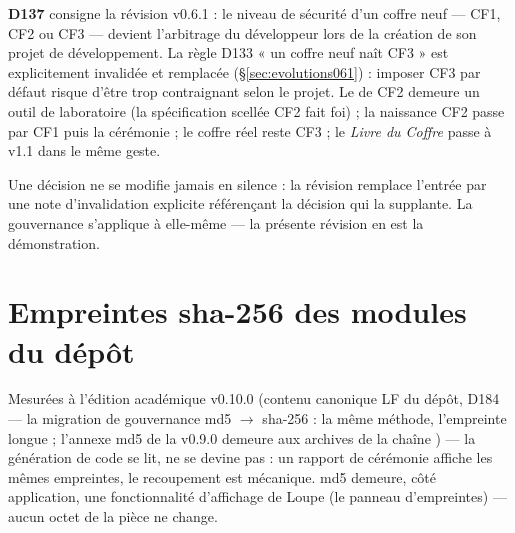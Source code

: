 \textbf{D137} consigne la révision v0.6.1 : le niveau de sécurité d'un coffre neuf —
CF1, CF2 ou CF3 — devient l'arbitrage du développeur lors de la création de son projet
de développement. La règle D133 « un coffre neuf naît CF3 » est explicitement
invalidée et remplacée (§\ref{sec:evolutions061}) : imposer CF3 par défaut risque
d'être trop contraignant selon le projet. Le  de CF2 demeure un outil de
laboratoire (la spécification scellée CF2 fait foi) ; la naissance CF2 passe par
 CF1 puis la cérémonie  ; le coffre réel reste CF3 ; le
\emph{Livre du Coffre} passe à v1.1 dans le même geste.

Une décision ne se modifie jamais en silence : la révision remplace l'entrée par une note
d'invalidation explicite référençant la décision qui la supplante. La gouvernance
s'applique à elle-même — la présente révision en est la démonstration.

\appendix
\section{Empreintes sha-256 des modules du dépôt}\label{sec:empreintes}

Mesurées à l'édition académique v0.10.0 (contenu canonique LF du dépôt,
D184 — la migration de gouvernance md5 $\to$ sha-256 : la même méthode,
l'empreinte longue ; l'annexe md5 de la v0.9.0 demeure aux archives de la
chaîne ) — la génération de code se lit, ne se devine pas :
un rapport de cérémonie affiche les mêmes empreintes, le recoupement est
mécanique. md5 demeure, côté application, une fonctionnalité d'affichage de
Loupe (le panneau d'empreintes) — aucun octet de la pièce ne change.


